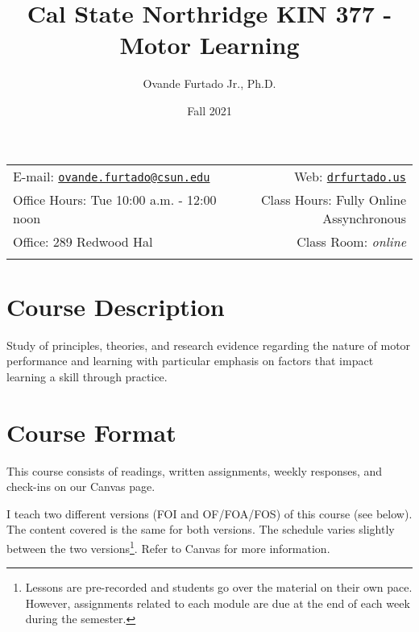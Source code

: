 \documentclass[11pt,]{article}
\title{Cal State Northridge \textbar{} KIN 377 - Motor Learning}
\author{Ovande Furtado Jr., Ph.D.}
\date{Fall 2021}
\begin{document}
  

		\maketitle
		
	
		\thispagestyle{firststyle}



	\noindent \begin{tabular*}{\textwidth}{ @{\extracolsep{\fill}} lr @{\extracolsep{\fill}}}


E-mail: \texttt{\href{mailto:ovande.furtado@csun.edu}{\nolinkurl{ovande.furtado@csun.edu}}} & Web: \href{http://drfurtado.us}{\tt drfurtado.us}\\
Office Hours: Tue 10:00 a.m. - 12:00 noon  &  Class Hours: Fully Online
Assynchronous\\
Office: 289 Redwood Hal  & Class Room: \emph{online}\\
	&  \\
	\hline
	\end{tabular*}
	
\vspace{2mm}
	


\hypertarget{course-description}{%
\section{Course Description}\label{course-description}}

Study of principles, theories, and research evidence regarding the
nature of motor performance and learning with particular emphasis on
factors that impact learning a skill through practice.

\hypertarget{course-format}{%
\section{Course Format}\label{course-format}}

This course consists of readings, written assignments, weekly responses,
and check-ins on our Canvas page.

I teach two different versions (FOI and OF/FOA/FOS) of this course (see
below). The content covered is the same for both versions. The schedule
varies slightly between the two versions\footnote{Lessons are
  pre-recorded and students go over the material on their own pace.
  However, assignments related to each module are due at the end of each
  week during the semester.}. Refer to Canvas for more information.
\end{document}
